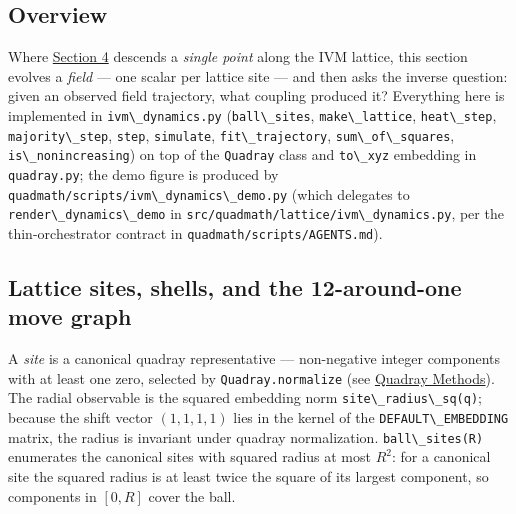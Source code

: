 \documentclass[
  10pt,
]{article}
\newcommand{\passthrough}[1]{#1}
\begin{document}
\subsection{Overview}\label{overview-5}

Where \href{04_optimization_in_4d.md}{Section 4} descends a \emph{single
point} along the IVM lattice, this section evolves a \emph{field} ---
one scalar per lattice site --- and then asks the inverse question:
given an observed field trajectory, what coupling produced it?
Everything here is implemented in
\passthrough{\lstinline!ivm\_dynamics.py!}
(\passthrough{\lstinline!ball\_sites!},
\passthrough{\lstinline!make\_lattice!},
\passthrough{\lstinline!heat\_step!},
\passthrough{\lstinline!majority\_step!},
\passthrough{\lstinline!step!}, \passthrough{\lstinline!simulate!},
\passthrough{\lstinline!fit\_trajectory!},
\passthrough{\lstinline!sum\_of\_squares!},
\passthrough{\lstinline!is\_nonincreasing!}) on top of the
\passthrough{\lstinline!Quadray!} class and
\passthrough{\lstinline!to\_xyz!} embedding in
\passthrough{\lstinline!quadray.py!}; the demo figure is produced by
\passthrough{\lstinline!quadmath/scripts/ivm\_dynamics\_demo.py!} (which
delegates to \passthrough{\lstinline!render\_dynamics\_demo!} in
\passthrough{\lstinline!src/quadmath/lattice/ivm\_dynamics.py!}, per the
thin-orchestrator contract in
\passthrough{\lstinline!quadmath/scripts/AGENTS.md!}).

\subsection{Lattice sites, shells, and the 12-around-one move
graph}\label{lattice-sites-shells-and-the-12-around-one-move-graph}

A \emph{site} is a canonical quadray representative --- non-negative
integer components with at least one zero, selected by
\passthrough{\lstinline!Quadray.normalize!} (see
\href{03_quadray_methods.md}{Quadray Methods}). The radial observable is
the squared embedding norm
\passthrough{\lstinline!site\_radius\_sq(q)!}; because the shift vector
\((1,1,1,1)\) lies in the kernel of the
\passthrough{\lstinline!DEFAULT\_EMBEDDING!} matrix, the radius is
invariant under quadray normalization.
\passthrough{\lstinline!ball\_sites(R)!} enumerates the canonical sites
with squared radius at most \(R^2\): for a canonical site the squared
radius is at least twice the square of its largest component, so
components in \([0, R]\) cover the ball.
\end{document}
